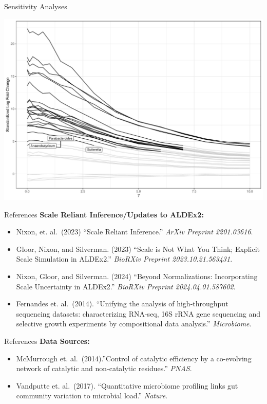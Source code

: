 \documentclass[
  ignorenonframetext,
]{beamer}
\begin{document}
\begin{frame}{Sensitivity Analyses}
\protect\hypertarget{sensitivity-analyses-3}{}
\begin{center}\includegraphics[width=0.95\linewidth]{slides_files/figure-beamer/unnamed-chunk-20-1} \end{center}
\end{frame}

\begin{frame}{References}
\protect\hypertarget{references}{}
\textbf{Scale Reliant Inference/Updates to ALDEx2:}

\begin{itemize}
\item
  Nixon, et. al.~(2023) ``Scale Reliant Inference.'' \emph{ArXiv
  Preprint 2201.03616}.
\item
  Gloor, Nixon, and Silverman. (2023) ``Scale is Not What You Think;
  Explicit Scale Simulation in ALDEx2.'' \emph{BioRXiv Preprint
  2023.10.21.563431}.
\item
  Nixon, Gloor, and Silverman. (2024) ``Beyond Normalizations:
  Incorporating Scale Uncertainty in ALDEx2.'' \emph{BioRXiv Preprint
  2024.04.01.587602}.
\item
  Fernandes et. al.~(2014). ``Unifying the analysis of high-throughput
  sequencing datasets: characterizing RNA-seq, 16S rRNA gene sequencing
  and selective growth experiments by compositional data analysis.''
  \emph{Microbiome}.
\end{itemize}
\end{frame}

\begin{frame}{References}
\protect\hypertarget{references-1}{}
\textbf{Data Sources:}

\begin{itemize}
\item
  McMurrough et. al.~(2014).''Control of catalytic efficiency by a
  co-evolving network of catalytic and non-catalytic residues.''
  \emph{PNAS}.
\item
  Vandputte et. al.~(2017). ``Quantitative microbiome profiling links
  gut community variation to microbial load.'' \emph{Nature}.
\end{itemize}
\end{frame}
\end{document}
